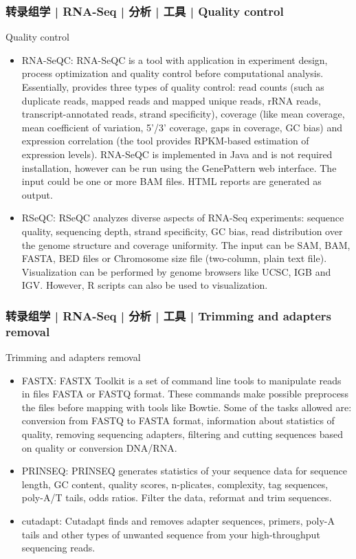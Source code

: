 \begin{frame}
  \frametitle{转录组学 | RNA-Seq | 分析 | 工具 | Quality control}
  {\footnotesize
  \begin{block}{Quality control}
    \begin{itemize}
      \item RNA-SeQC: RNA-SeQC is a tool with application in experiment design, process optimization and quality control before computational analysis. Essentially, provides three types of quality control: read counts (such as duplicate reads, mapped reads and mapped unique reads, rRNA reads, transcript-annotated reads, strand specificity), coverage (like mean coverage, mean coefficient of variation, 5'/3' coverage, gaps in coverage, GC bias) and expression correlation (the tool provides RPKM-based estimation of expression levels). RNA-SeQC is implemented in Java and is not required installation, however can be run using the GenePattern web interface. The input could be one or more BAM files. HTML reports are generated as output.
      \item RSeQC: RSeQC analyzes diverse aspects of RNA-Seq experiments: sequence quality, sequencing depth, strand specificity, GC bias, read distribution over the genome structure and coverage uniformity. The input can be SAM, BAM, FASTA, BED files or Chromosome size file (two-column, plain text file). Visualization can be performed by genome browsers like UCSC, IGB and IGV. However, R scripts can also be used to visualization.
    \end{itemize}
  \end{block}
  }
\end{frame}

\begin{frame}
  \frametitle{转录组学 | RNA-Seq | 分析 | 工具 | Trimming and adapters removal}
    {\footnotesize
  \begin{block}{Trimming and adapters removal}
    \begin{itemize}
      \item FASTX: FASTX Toolkit is a set of command line tools to manipulate reads in files FASTA or FASTQ format. These commands make possible preprocess the files before mapping with tools like Bowtie. Some of the tasks allowed are: conversion from FASTQ to FASTA format, information about statistics of quality, removing sequencing adapters, filtering and cutting sequences based on quality or conversion DNA/RNA.
      \item PRINSEQ: PRINSEQ generates statistics of your sequence data for sequence length, GC content, quality scores, n-plicates, complexity, tag sequences, poly-A/T tails, odds ratios. Filter the data, reformat and trim sequences.
      \item cutadapt: Cutadapt finds and removes adapter sequences, primers, poly-A tails and other types of unwanted sequence from your high-throughput sequencing reads.
    \end{itemize}
  \end{block}
  }
\end{frame}

